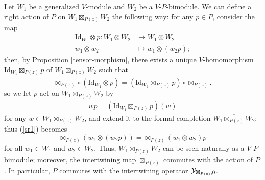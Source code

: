 \documentclass[12pt]{article}
\begin{document}
Let $W_1$ be a generalized $V$-module and $W_2$ be a $V$-$P$-bimodule. We can
define a right action of $P$ on $W_1\boxtimes_{P(z)} W_2$ the following way:
for any $p\in P$, consider the map
\begin{align*}
    \text{Id}_{W_1}\otimes p : W_1\otimes W_2 &\rightarrow W_1\otimes W_2\\
    w_1\otimes w_2 &\mapsto w_1 \otimes (w_2p);
\end{align*}
then, by Proposition \ref{tensor-morphism}, there exists a unique $V$-homomorphism
$\text{Id}_{W_1}\boxtimes_{P(z)} p$ of $W_1\boxtimes_{P(z)} W_2$
such that
\begin{equation}\label{sr1}
  \boxtimes_{P(z)}\circ (\text{Id}_{W_1}\otimes p) =
  \overline{(\text{Id}_{W_1}\boxtimes_{P(z)} p)} \circ \boxtimes_{P(z)}.
\end{equation}
so we let $p$ act on $W_1\boxtimes_{P(z)} W_2$ by
\begin{align*}
  wp = (\text{Id}_{W_1}\boxtimes_{P(z)}p)(w)
\end{align*}
for any $w\in W_1\boxtimes_{P(z)} W_2$, and extend it to the formal completion
$\overline {W_1\boxtimes_{P(z)} W_2}$; thus (\ref{sr1}) becomes
\begin{equation}
  \boxtimes_{P(z)}(w_1\otimes (w_2p)) =
  \boxtimes_{P(z)}(w_1\otimes w_2)p
\end{equation}
for all $w_1\in W_1$ and $w_2 \in W_2$.
Thus, $W_1\boxtimes_{P(z)}W_2$ can be seen naturally
as a $V$-$P$-bimodule; moreover, the intertwining
map $\boxtimes_{P(z)}$ commutes with the action of $P$.
In particular, $P$ commutes with the intertwining operator $\mathcal{Y}_{\boxtimes_{P(z)},0}$.
\end{document}
